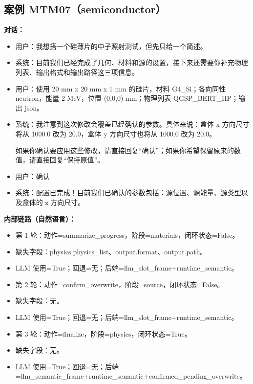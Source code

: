 \documentclass[11pt]{ctexart}
\begin{document}
\subsection{案例 MTM07（semiconductor）}
\textbf{对话：}
\begin{itemize}
\item 用户：我想搭一个硅薄片的中子照射测试，但先只给一个简述。
\item 系统：目前我们已经完成了几何、材料和源的设置，接下来还需要你补充物理列表、输出格式和输出路径这三项信息。
\item 用户：使用 20 mm x 20 mm x 1 mm 的硅片，材料 G4\_Si；各向同性 neutron，能量 2 MeV，位置 (0,0,0) mm；物理列表 QGSP\_BERT\_HP；输出 json。
\item 系统：我注意到这次修改会覆盖已经确认的参数。具体来说：盒体 x 方向尺寸将从 1000.0 改为 20.0，盒体 y 方向尺寸也将从 1000.0 改为 20.0。

如果你确认要应用这些修改，请直接回复“确认”；如果你希望保留原来的数值，请直接回复“保持原值”。
\item 用户：确认
\item 系统：配置已完成！目前我们已确认的参数包括：源位置、源能量、源类型以及盒体的 z 方向尺寸。
\end{itemize}
\textbf{内部链路（自然语言）：}
\begin{itemize}
\item 第 1 轮：动作=summarize\_progress，阶段=materials，闭环状态=False。
\item 缺失字段：physics.physics\_list、output.format、output.path。
\item LLM 使用=True；回退=无；后端=llm\_slot\_frame+runtime\_semantic。
\item 第 2 轮：动作=confirm\_overwrite，阶段=source，闭环状态=False。
\item 缺失字段：无。
\item LLM 使用=True；回退=无；后端=llm\_slot\_frame+runtime\_semantic。
\item 第 3 轮：动作=finalize，阶段=physics，闭环状态=True。
\item 缺失字段：无。
\item LLM 使用=True；回退=无；后端=llm\_semantic\_frame+runtime\_semantic+confirmed\_pending\_overwrite。
\end{itemize}
\end{document}
